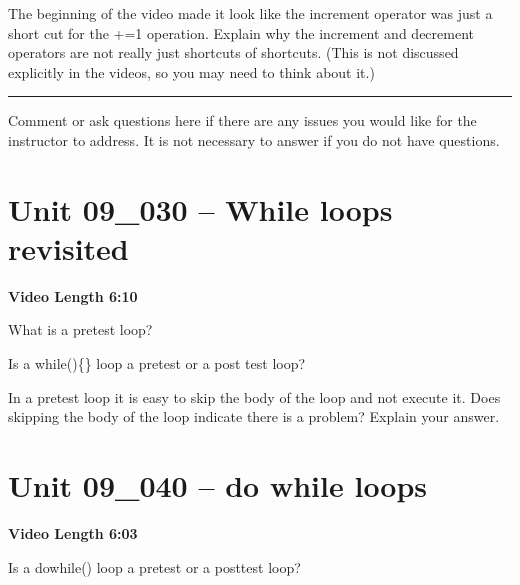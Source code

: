 \documentclass[letterpaper,12pt]{exam}
\newcommand{\unit}{Unit 09}
\begin{document}
\begin{questions}
\begin{samepage}
    \question The beginning of the video made it look like the increment operator was just a short cut for the +=1 operation.  Explain why the increment and decrement operators are not really just shortcuts of shortcuts.  (This is not discussed explicitly in the videos, so you may need to think about it.)
    \vspace{5mm}
\end{samepage}


\begin{samepage}
    \begin{center}
    \rule{0.8\textwidth}{.4pt}
    \end{center}
	\question Comment or ask questions here if there are any issues you would like for the instructor to address.  It is not necessary to answer if you do not have questions.
	\vspace{30mm}
\end{samepage}
\section*{\unit\_030 -- While loops revisited} %
\par{\selectfont\textbf{Video Length 6:10}}
\begin{samepage}
    \question What is a pretest loop?
    \vspace{5mm}
\end{samepage}

\begin{samepage}
    \question Is a while()\{\} loop a pretest or a post test loop?
    \vspace{5mm}
\end{samepage}
\begin{samepage}
    \question In a pretest loop it is easy to skip the body of the loop and not execute it.  Does skipping the body of the loop indicate there is a problem?  Explain your answer.
    \vspace{5mm}
\end{samepage}


\section*{\unit\_040 -- do while loops} 
\par{\selectfont\textbf{Video Length 6:03}}
\begin{samepage}
    \question Is a do{}while() loop a pretest or a posttest loop?
    \vspace{5mm}
\end{samepage}


\end{questions}
\end{document}
